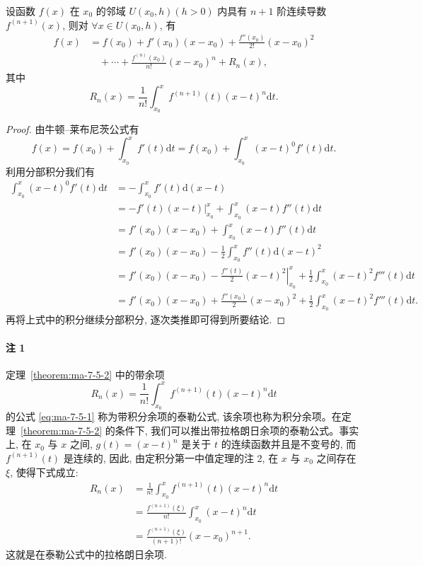 \begin{theorem}\label{theorem:ma-7-5-2}
设函数 $f(x)$ 在 $x_0$ 的邻域 $U(x_0,h)(h>0)$ 内具有 $n+1$ 阶连续导数 $f^{(n+1)}(x)$, 则对 $\forall x\in U(x_0,h)$, 有
\begin{equation}
\begin{aligned}
  f(x)&=f(x_0)+f'(x_0)(x-x_0)+\frac{f''(x_0)}{2!}(x-x_0)^2\\
  &\quad+\cdots+\frac{f^{(n)}(x_0)}{n!}(x-x_0)^n+R_n(x),
\end{aligned}
\label{eq:ma-7-5-1}
\end{equation}
其中
\[
  R_n(x)=\frac{1}{n!}\int_{x_0}^x f^{(n+1)}(t)(x-t)^n\mathrm dt.
\]
\end{theorem}


\begin{proof}
由牛顿--莱布尼茨公式有
\[
  f(x)=f(x_0)+\int_{x_0}^x f'(t)\mathrm dt
  =f(x_0)+\int_{x_0}^x (x-t)^0f'(t)\mathrm dt.
\]
利用分部积分我们有
\[
\begin{aligned}
  \int_{x_0}^x (x-t)^0f'(t)\mathrm dt
  &=-\int_{x_0}^x f'(t)\mathrm d(x-t)\\
  &=-\left.f'(t)(x-t)\right|_{x_0}^x+\int_{x_0}^x (x-t)f''(t)\mathrm dt\\
  &=f'(x_0)(x-x_0)+\int_{x_0}^x (x-t)f''(t)\mathrm dt\\
  &=f'(x_0)(x-x_0)-\frac{1}{2}\int_{x_0}^x f''(t)\mathrm d(x-t)^2\\
  &=f'(x_0)(x-x_0)-\left.\frac{f''(t)}{2}(x-t)^2\right|_{x_0}^x
  +\frac{1}{2}\int_{x_0}^x (x-t)^2f'''(t)\mathrm dt\\
  &=f'(x_0)(x-x_0)+\frac{f''(x_0)}{2}(x-x_0)^2
  +\frac{1}{2}\int_{x_0}^x (x-t)^2f'''(t)\mathrm dt.
\end{aligned}
\]
再将上式中的积分继续分部积分, 逐次类推即可得到所要结论.
\end{proof}


\paragraph*{注 1}
定理~\ref{theorem:ma-7-5-2} 中的带余项
\[
  R_n(x)=\frac{1}{n!}\int_{x_0}^x f^{(n+1)}(t)(x-t)^n\mathrm dt
\]
的公式 \eqref{eq:ma-7-5-1} 称为带积分余项的泰勒公式, 该余项也称为积分余项。在定理~\ref{theorem:ma-7-5-2} 的条件下, 我们可以推出带拉格朗日余项的泰勒公式。事实上, 在 $x_0$ 与 $x$ 之间, $g(t)=(x-t)^n$ 是关于 $t$ 的连续函数并且是不变号的, 而 $f^{(n+1)}(t)$ 是连续的, 因此, 由定积分第一中值定理的注 2, 在 $x$ 与 $x_0$ 之间存在 $\xi$, 使得下式成立:
\[
\begin{aligned}
  R_n(x)&=\frac{1}{n!}\int_{x_0}^x f^{(n+1)}(t)(x-t)^n\mathrm dt\\
  &=\frac{f^{(n+1)}(\xi)}{n!}\int_{x_0}^x (x-t)^n\mathrm dt\\
  &=\frac{f^{(n+1)}(\xi)}{(n+1)!}(x-x_0)^{n+1}.
\end{aligned}
\]
这就是在泰勒公式中的拉格朗日余项.


